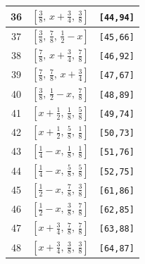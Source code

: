 \documentclass[fleqn,8pt]{jsarticle}
\begin{document}
\begin{longtable}{ccc}
36 & $\left[ \frac{3}{8},\, x + \frac{3}{4},\, \frac{3}{8} \right]$ & {\tt [44,94]} \\ \hline
37 & $\left[ \frac{3}{8},\, \frac{7}{8},\, \frac{1}{2} - x \right]$ & {\tt [45,66]} \\ \hline
38 & $\left[ \frac{7}{8},\, x + \frac{3}{4},\, \frac{7}{8} \right]$ & {\tt [46,92]} \\ \hline
39 & $\left[ \frac{7}{8},\, \frac{7}{8},\, x + \frac{3}{4} \right]$ & {\tt [47,67]} \\ \hline
40 & $\left[ \frac{3}{8},\, \frac{1}{2} - x,\, \frac{7}{8} \right]$ & {\tt [48,89]} \\ \hline
41 & $\left[ x + \frac{1}{2},\, \frac{1}{8},\, \frac{5}{8} \right]$ & {\tt [49,74]} \\ \hline
42 & $\left[ x + \frac{1}{2},\, \frac{5}{8},\, \frac{1}{8} \right]$ & {\tt [50,73]} \\ \hline
43 & $\left[ \frac{1}{4} - x,\, \frac{1}{8},\, \frac{1}{8} \right]$ & {\tt [51,76]} \\ \hline
44 & $\left[ \frac{1}{4} - x,\, \frac{5}{8},\, \frac{5}{8} \right]$ & {\tt [52,75]} \\ \hline
45 & $\left[ \frac{1}{2} - x,\, \frac{7}{8},\, \frac{3}{8} \right]$ & {\tt [61,86]} \\ \hline
46 & $\left[ \frac{1}{2} - x,\, \frac{3}{8},\, \frac{7}{8} \right]$ & {\tt [62,85]} \\ \hline
47 & $\left[ x + \frac{3}{4},\, \frac{7}{8},\, \frac{7}{8} \right]$ & {\tt [63,88]} \\ \hline
48 & $\left[ x + \frac{3}{4},\, \frac{3}{8},\, \frac{3}{8} \right]$ & {\tt [64,87]} \\
\end{longtable}
\renewcommand{\arraystretch}{1.2}
\end{document}
